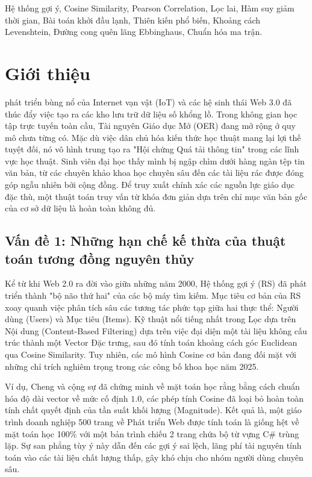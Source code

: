\documentclass[journal]{IEEEtran}
\begin{document}
\begin{IEEEkeywords}
Hệ thống gợi ý, Cosine Similarity, Pearson Correlation, Lọc lai, 
Hàm suy giảm thời gian, Bài toán khởi đầu lạnh, Thiên kiến phổ biến, Khoảng cách Levenshtein, 
Đường cong quên lãng Ebbinghaus, Chuẩn hóa ma trận.
\end{IEEEkeywords}

\section{Giới thiệu}
\label{sec:introduction}

 phát triển bùng nổ của Internet vạn vật (IoT) 
và các hệ sinh thái Web 3.0 đã thúc đẩy việc tạo ra các kho lưu trữ dữ liệu số khổng lồ. 
Trong không gian học tập trực tuyến toàn cầu, Tài nguyên Giáo dục Mở (OER) đang mở rộng ở quy mô chưa từng có. 
Mặc dù việc dân chủ hóa kiến thức học thuật mang lại lợi thế tuyệt đối, 
nó vô hình trung tạo ra "Hội chứng Quá tải thông tin" trong các lĩnh vực học thuật. 
Sinh viên đại học thấy mình bị ngập chìm dưới hàng ngàn tệp tin văn bản, 
từ các chuyên khảo khoa học chuyên sâu đến các tài liệu rác được đóng góp ngẫu nhiên bởi cộng đồng. 
Để truy xuất chính xác các nguồn lực giáo dục đặc thù, 
một thuật toán truy vấn từ khóa đơn giản dựa trên chỉ mục văn bản gốc của cơ sở dữ liệu là hoàn toàn không đủ.

\subsection{Vấn đề 1: Những hạn chế kế thừa của thuật toán tương đồng nguyên thủy}

Kể từ khi Web 2.0 ra đời vào giữa những năm 2000, 
Hệ thống gợi ý (RS) đã phát triển thành "bộ não thứ hai" của các bộ máy tìm kiếm. 
Mục tiêu cơ bản của RS xoay quanh việc phân tích sâu các tương tác phức tạp giữa hai thực thể: Người dùng (Users) và Mục tiêu (Items). 
Kỹ thuật nổi tiếng nhất trong Lọc dựa trên Nội dung (Content-Based Filtering) dựa trên việc đại diện một tài liệu không cấu trúc thành một Vector Đặc trưng, 
sau đó tính toán khoảng cách góc Euclidean qua Cosine Similarity. 
Tuy nhiên, các mô hình Cosine cơ bản đang đối mặt với những chỉ trích nghiêm trọng trong các công bố khoa học năm 2025.

Ví dụ, Cheng và cộng sự \cite{magnitude2025} đã chứng minh về mặt toán học rằng bằng cách chuẩn hóa độ dài vector về mức cố định $1.0$, 
các phép tính Cosine đã loại bỏ hoàn toàn tính chất quyết định của tần suất khối lượng (Magnitude). 
Kết quả là, một giáo trình doanh nghiệp 500 trang về Phát triển Web được tính toán là giống hệt về mặt toán học 100\% 
với một bản trình chiếu 2 trang chứa bộ từ vựng C\# trùng lặp. 
Sự san phẳng tùy ý này dẫn đến các gợi ý sai lệch, lãng phí tài nguyên tính toán vào các tài liệu chất lượng thấp, gây khó chịu cho nhóm người dùng chuyên sâu.
\end{document}
